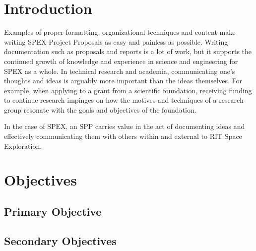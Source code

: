 \documentclass[journal]{SPEXformat}
\begin{document}
\section{Introduction}
\label{sec:introduction}
Examples of proper formatting, organizational techniques and content make writing SPEX Project Proposals as easy and painless as possible.
Writing documentation such as proposals and reports is a lot of work, but it supports the continued growth of knowledge and experience in science and engineering for SPEX as a whole.
In technical research and academia, communicating one's thoughts and ideas is arguably more important than the ideas themselves.
For example, when applying to a grant from a scientific foundation, receiving funding to continue research impinges on how the motives and techniques of a research group resonate with the goals and objectives of the foundation.

In the case of SPEX, an SPP carries value in the act of documenting ideas and effectively communicating them with others within and external to RIT Space Exploration.

\section{Objectives}
\label{sec:objectives}
\subsection{Primary Objective}
\label{subsec:primary-objective}
\subsection{Secondary Objectives}
\label{subsec:secondary-objective}
\end{document}

